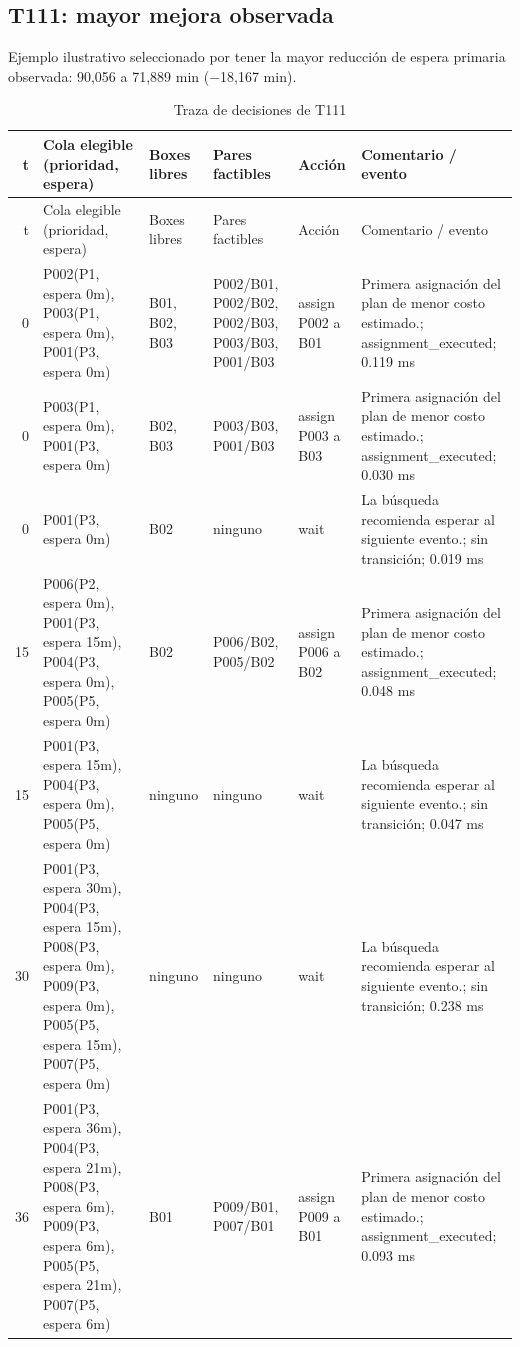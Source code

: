 \subsection{T111: mayor mejora observada}
Ejemplo ilustrativo seleccionado por tener la mayor reducción de espera primaria observada: 90,056 a 71,889 min (−18,167 min).
\begin{longtable}{r p{3.0cm} p{1.25cm} p{2.7cm} p{2.0cm} p{2.4cm}}
\caption{Traza de decisiones de T111}\label{tab:trace_t111}\\
\toprule t & Cola elegible (prioridad, espera) & Boxes libres & Pares factibles & Acción & Comentario / evento \\
\midrule\endfirsthead
\toprule t & Cola elegible (prioridad, espera) & Boxes libres & Pares factibles & Acción & Comentario / evento \\
\midrule\endhead
0 & P002(P1, espera 0m), P003(P1, espera 0m), P001(P3, espera 0m) & B01, B02, B03 & P002/B01, P002/B02, P002/B03, P003/B03, P001/B03 & assign P002 a B01 & Primera asignación del plan de menor costo estimado.; assignment\_executed; 0.119 ms \\
0 & P003(P1, espera 0m), P001(P3, espera 0m) & B02, B03 & P003/B03, P001/B03 & assign P003 a B03 & Primera asignación del plan de menor costo estimado.; assignment\_executed; 0.030 ms \\
0 & P001(P3, espera 0m) & B02 & ninguno & wait & La búsqueda recomienda esperar al siguiente evento.; sin transición; 0.019 ms \\
15 & P006(P2, espera 0m), P001(P3, espera 15m), P004(P3, espera 0m), P005(P5, espera 0m) & B02 & P006/B02, P005/B02 & assign P006 a B02 & Primera asignación del plan de menor costo estimado.; assignment\_executed; 0.048 ms \\
15 & P001(P3, espera 15m), P004(P3, espera 0m), P005(P5, espera 0m) & ninguno & ninguno & wait & La búsqueda recomienda esperar al siguiente evento.; sin transición; 0.047 ms \\
30 & P001(P3, espera 30m), P004(P3, espera 15m), P008(P3, espera 0m), P009(P3, espera 0m), P005(P5, espera 15m), P007(P5, espera 0m) & ninguno & ninguno & wait & La búsqueda recomienda esperar al siguiente evento.; sin transición; 0.238 ms \\
36 & P001(P3, espera 36m), P004(P3, espera 21m), P008(P3, espera 6m), P009(P3, espera 6m), P005(P5, espera 21m), P007(P5, espera 6m) & B01 & P009/B01, P007/B01 & assign P009 a B01 & Primera asignación del plan de menor costo estimado.; assignment\_executed; 0.093 ms \\

\end{longtable}
